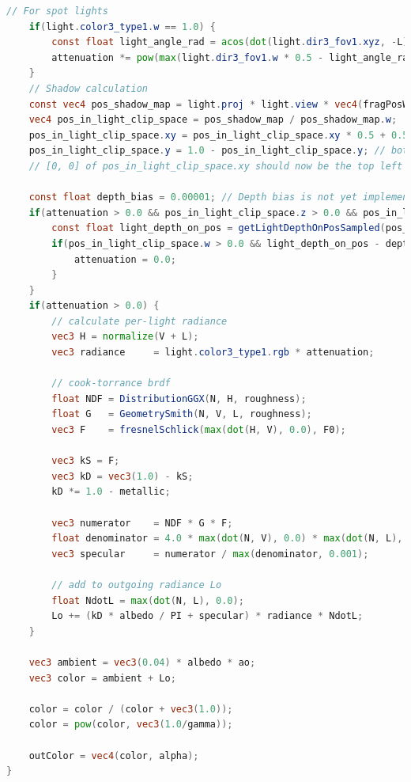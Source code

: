 \documentclass[oneside]{ausarbeitung}
\begin{document}
\begin{lstlisting}[language=glsl, label={lst:fragment_shader}, caption={Kompletter GLSL-Code des Fragment-Shaders der in der \textbf{spider}-Engine für das \ac{PBR} benutzt wird}]
    // For spot lights
    if(light.color3_type1.w == 1.0) {
        const float light_angle_rad = acos(dot(light.dir3_fov1.xyz, -L));
        attenuation *= pow(max(light.dir3_fov1.w * 0.5 - light_angle_rad, 0.0) / 3.14, 1.0 - (light_fov * light_fov));
    }
    // Shadow calculation
    const vec4 pos_shadow_map = light.proj * light.view * vec4(fragPosWorld, 1.0);
    vec4 pos_in_light_clip_space = pos_shadow_map / pos_shadow_map.w;
    pos_in_light_clip_space.xy = pos_in_light_clip_space.xy * 0.5 + 0.5; // [-1,1] to [0,1]
    pos_in_light_clip_space.y = 1.0 - pos_in_light_clip_space.y; // bottom-up to top-down
    // [0, 0] of pos_in_light_clip_space.xy should now be the top left corner and [1, 1] the bottom right --> texture space

    const float depth_bias = 0.00001; // Depth bias is not yet implemented in Chromium/dawn, so we have to "fake" it in the shader
    if(attenuation > 0.0 && pos_in_light_clip_space.z > 0.0 && pos_in_light_clip_space.z < 1.0) {
        const float light_depth_on_pos = getLightDepthOnPosSampled(pos_in_light_clip_space.xy);
        if(pos_in_light_clip_space.w > 0.0 && light_depth_on_pos - depth_bias > pos_in_light_clip_space.z) {
            attenuation = 0.0;
        }
    }
    if(attenuation > 0.0) {
        // calculate per-light radiance
        vec3 H = normalize(V + L);
        vec3 radiance     = light.color3_type1.rgb * attenuation;
        
        // cook-torrance brdf
        float NDF = DistributionGGX(N, H, roughness);
        float G   = GeometrySmith(N, V, L, roughness);
        vec3 F    = fresnelSchlick(max(dot(H, V), 0.0), F0);
        
        vec3 kS = F;
        vec3 kD = vec3(1.0) - kS;
        kD *= 1.0 - metallic;
        
        vec3 numerator    = NDF * G * F;
        float denominator = 4.0 * max(dot(N, V), 0.0) * max(dot(N, L), 0.0);
        vec3 specular     = numerator / max(denominator, 0.001);  
            
        // add to outgoing radiance Lo
        float NdotL = max(dot(N, L), 0.0);                
        Lo += (kD * albedo / PI + specular) * radiance * NdotL;
    }
  
    vec3 ambient = vec3(0.04) * albedo * ao;
    vec3 color = ambient + Lo;
	
    color = color / (color + vec3(1.0));
    color = pow(color, vec3(1.0/gamma));  
   
    outColor = vec4(color, alpha);
}
\end{lstlisting}
\end{document}
